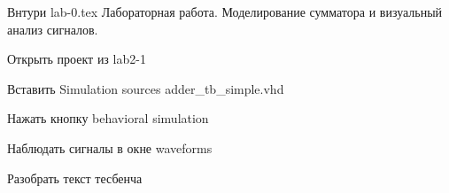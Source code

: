 Внтури lab-0.tex
Лабораторная работа. Моделирование сумматора и визуальный анализ сигналов.

Открыть проект из lab2-1

Вставить Simulation sources adder_tb_simple.vhd

Нажать кнопку behavioral simulation

Наблюдать сигналы в окне waveforms

Разобрать текст тесбенча

\begin{Code}
\begin{lstlisting}[caption=Простая тестбенч, label=tb_0]

\end{lstlisting}
\end{Code}